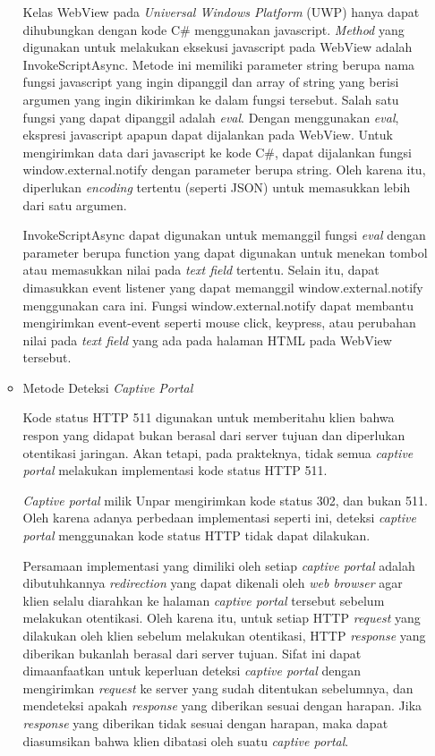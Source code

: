 \documentclass[a4paper,twoside]{article}
\begin{document}
\begin{enumerate}
\begin{itemize}
{                Kelas WebView pada \textit{Universal Windows Platform} (UWP) hanya dapat dihubungkan dengan kode C\# menggunakan javascript. \textit{Method} yang digunakan untuk melakukan eksekusi javascript pada WebView adalah InvokeScriptAsync. Metode ini memiliki parameter string berupa nama fungsi javascript yang ingin dipanggil dan array of string yang berisi argumen yang ingin dikirimkan ke dalam fungsi tersebut. Salah satu fungsi yang dapat dipanggil adalah \textit{eval}. Dengan menggunakan \textit{eval}, ekspresi javascript apapun dapat dijalankan pada WebView. Untuk mengirimkan data dari javascript ke kode C\#, dapat dijalankan fungsi window.external.notify dengan parameter berupa string. Oleh karena itu, diperlukan \textit{encoding} tertentu (seperti JSON) untuk memasukkan lebih dari satu argumen.

                InvokeScriptAsync dapat digunakan untuk memanggil fungsi \textit{eval} dengan parameter berupa function yang dapat digunakan untuk menekan tombol atau memasukkan nilai pada \textit{text field} tertentu. Selain itu, dapat dimasukkan event listener yang dapat memanggil window.external.notify menggunakan cara ini. Fungsi window.external.notify dapat membantu mengirimkan event-event seperti mouse click, keypress, atau perubahan nilai pada \textit{text field} yang ada pada halaman HTML pada WebView tersebut.
            }
            \item{
                Metode Deteksi \textit{Captive Portal}
                
                Kode status HTTP 511 digunakan untuk memberitahu klien bahwa respon yang didapat bukan berasal dari server tujuan dan diperlukan otentikasi jaringan. Akan tetapi, pada prakteknya, tidak semua \textit{captive portal} melakukan implementasi kode status HTTP 511.
                
                \textit{Captive portal} milik Unpar mengirimkan kode status 302, dan bukan 511. Oleh karena adanya perbedaan implementasi seperti ini, deteksi \textit{captive portal} menggunakan kode status HTTP tidak dapat dilakukan.
                
                Persamaan implementasi yang dimiliki oleh setiap \textit{captive portal} adalah dibutuhkannya \textit{redirection} yang dapat dikenali oleh \textit{web browser} agar klien selalu diarahkan ke halaman \textit{captive portal} tersebut sebelum melakukan otentikasi. Oleh karena itu, untuk setiap HTTP \textit{request} yang dilakukan oleh klien sebelum melakukan otentikasi, HTTP \textit{response} yang diberikan bukanlah berasal dari server tujuan. Sifat ini dapat dimaanfaatkan untuk keperluan deteksi \textit{captive portal} dengan mengirimkan \textit{request} ke server yang sudah ditentukan sebelumnya, dan mendeteksi apakah \textit{response} yang diberikan sesuai dengan harapan. Jika \textit{response} yang diberikan tidak sesuai dengan harapan, maka dapat diasumsikan bahwa klien dibatasi oleh suatu \textit{captive portal}.

}
\end{itemize}
\end{enumerate}
\end{document}

